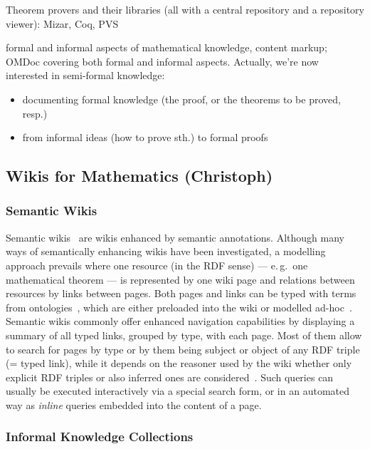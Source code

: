 \documentclass{llncs}
\begin{document}
Theorem provers and their libraries (all with a central repository and a repository
viewer): Mizar, Coq, PVS

formal and informal aspects of mathematical knowledge, content markup; OMDoc covering both
formal and informal aspects.  Actually, we're now interested in semi-formal
knowledge:
\begin{itemize}
\item documenting formal knowledge (the proof, or the theorems to be proved, resp.)
\item from informal ideas (how to prove sth.) to formal proofs
\end{itemize}

\subsection{Wikis for Mathematics (Christoph)}
\label{sec:math-wiki}

\subsubsection{Semantic Wikis}
\label{sec:semwiki}

Semantic wikis~\cite{semwiki06} are wikis enhanced by semantic annotations.  Although many
ways of semantically enhancing wikis have been investigated, a modelling approach prevails
where one resource (in the RDF sense) --- e.\,g.\ one mathematical theorem --- is
represented by one wiki page and relations between resources by links between pages.  Both
pages and links can be typed with terms from
ontologies~\cite{OrDeMoVoHa06:annotation-navigation-semwiki}, which are either preloaded
into the wiki or modelled ad-hoc~\cite{KrSchVr:semwiki-reasoning07}.  Semantic wikis
commonly offer enhanced navigation capabilities by displaying a summary of all typed
links, grouped by type, with each page.  Most of them allow to search for pages by type or
by them being subject or object of any RDF triple (= typed link), while it depends on the
reasoner used by the wiki whether only explicit RDF triples or also inferred ones are
considered~\cite{KrSchVr:semwiki-reasoning07}.  Such queries can usually be executed
interactively via a special search form, or in an automated way as \emph{inline} queries
embedded into the content of a page.

\subsubsection{Informal Knowledge Collections}
\label{sec:math-knowledge-collections}
\end{document}
